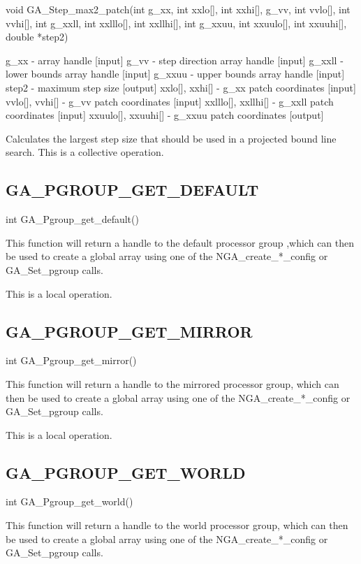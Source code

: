 void GA\_Step\_max2\_patch(int g\_xx, int xxlo{[}{]}, int xxhi{[}{]},
g\_vv, int vvlo{[}{]}, int vvhi{[}{]}, int g\_xxll, int xxlllo{[}{]},
int xxllhi{[}{]}, int g\_xxuu, int xxuulo{[}{]}, int xxuuhi{[}{]},
double {*}step2)

g\_xx - array handle {[}input{]} g\_vv - step direction array handle
{[}input{]} g\_xxll - lower bounds array handle {[}input{]} g\_xxuu
- upper bounds array handle {[}input{]} step2 - maximum step size
{[}output{]} xxlo{[}{]}, xxhi{[}{]} - g\_xx patch coordinates {[}input{]}
vvlo{[}{]}, vvhi{[}{]} - g\_vv patch coordinates {[}input{]} xxlllo{[}{]},
xxllhi{[}{]} - g\_xxll patch coordinates {[}input{]} xxuulo{[}{]},
xxuuhi{[}{]} - g\_xxuu patch coordinates {[}output{]}

Calculates the largest step size that should be used in a projected
bound line search. This is a collective operation. 


\subsection*{GA\_PGROUP\_GET\_DEFAULT}

int GA\_Pgroup\_get\_default()

This function will return a handle to the default processor group
,which can then be used to create a global array using one of the
NGA\_create\_{*}\_config or GA\_Set\_pgroup calls.

This is a local operation. 


\subsection*{GA\_PGROUP\_GET\_MIRROR}

int GA\_Pgroup\_get\_mirror()

This function will return a handle to the mirrored processor group,
which can then be used to create a global array using one of the NGA\_create\_{*}\_config
or GA\_Set\_pgroup calls.

This is a local operation. 


\subsection*{GA\_PGROUP\_GET\_WORLD}

int GA\_Pgroup\_get\_world()

This function will return a handle to the world processor group, which
can then be used to create a global array using one of the NGA\_create\_{*}\_config
or GA\_Set\_pgroup calls.

